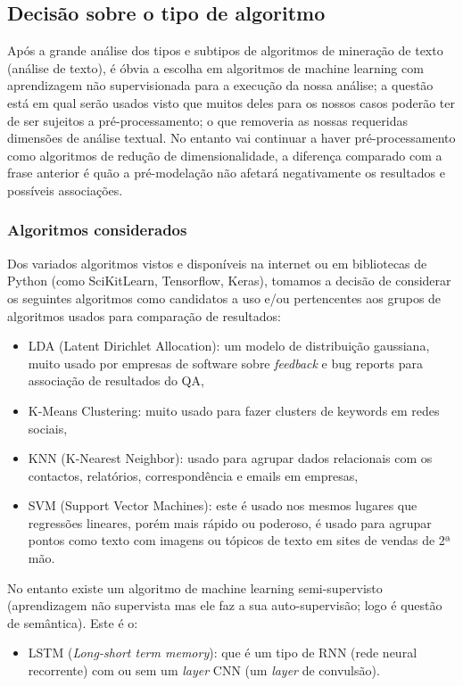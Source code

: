 \documentclass[a4paper,10pt]{article}
\begin{document}
\subsection{Decisão sobre o tipo de algoritmo}

Após a grande análise dos tipos e subtipos de algoritmos de mineração de texto (análise de texto), é óbvia a escolha em algoritmos de machine learning com aprendizagem não supervisionada para a execução da nossa análise; a questão está em qual serão usados visto que muitos deles para os nossos casos poderão ter de ser sujeitos a pré-processamento; o que removeria as nossas requeridas dimensões de análise textual.
No entanto vai continuar a haver pré-processamento como algoritmos de redução de dimensionalidade, a diferença comparado com a frase anterior é quão a pré-modelação não afetará negativamente os resultados e possíveis associações.

\subsubsection{Algoritmos considerados}

Dos variados algoritmos vistos e disponíveis na internet ou em bibliotecas de Python (como SciKitLearn, Tensorflow, Keras), tomamos a decisão de considerar os seguintes algoritmos como candidatos a uso e/ou pertencentes aos grupos de algoritmos usados para comparação de resultados:
\begin{itemize}
  \item LDA (Latent Dirichlet Allocation): um modelo de distribuição gaussiana, muito usado por empresas de software sobre \textit{feedback} e bug reports para associação de resultados do QA,
  \item K-Means Clustering: muito usado para fazer clusters de keywords em redes sociais,
  \item KNN (K-Nearest Neighbor): usado para agrupar dados relacionais com os contactos, relatórios, correspondência e emails em empresas,
  \item SVM (Support Vector Machines): este é usado nos mesmos lugares que regressões lineares, porém mais rápido ou poderoso, é usado para agrupar pontos como texto com imagens ou tópicos de texto em sites de vendas de 2ª mão.
\end{itemize}

No entanto existe um algoritmo de machine learning semi-supervisto (aprendizagem não supervista mas ele faz a sua auto-supervisão; logo é questão de semântica).
Este é o:
\begin{itemize}
  \item LSTM (\textit{Long-short term memory}): que é um tipo de RNN (rede neural recorrente) com ou sem um \textit{layer} CNN (um \textit{layer} de convulsão).
\end{itemize}
\end{document}
